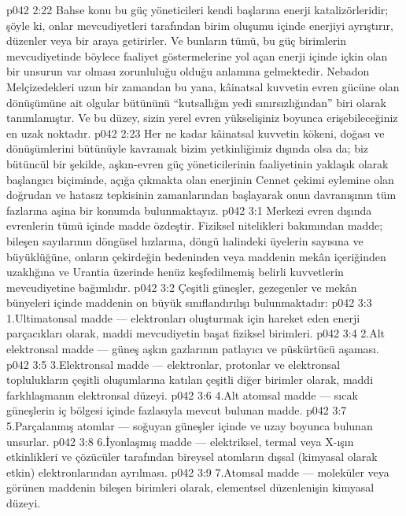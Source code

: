 \vs p042 2:22 Bahse konu bu güç yöneticileri kendi başlarına enerji katalizörleridir; şöyle ki, onlar mevcudiyetleri tarafından birim oluşumu içinde enerjiyi ayrıştırır, düzenler veya bir araya getirirler. Ve bunların tümü, bu güç birimlerin mevcudiyetinde böylece faaliyet göstermelerine yol açan enerji içinde içkin olan bir unsurun var olması zorunluluğu olduğu anlamına gelmektedir. Nebadon Melçizedekleri uzun bir zamandan bu yana, kâinatsal kuvvetin evren gücüne olan dönüşümüne ait olgular bütününü “kutsallığın yedi sınırsızlığından” biri olarak tanımlamıştır. Ve bu düzey, sizin yerel evren yükselişiniz boyunca erişebileceğiniz en uzak noktadır.
\vs p042 2:23 Her ne kadar kâinatsal kuvvetin kökeni, doğası ve dönüşümlerini bütünüyle kavramak bizim yetkinliğimiz dışında olsa da; biz bütüncül bir şekilde, aşkın\hyp{}evren güç yöneticilerinin faaliyetinin yaklaşık olarak başlangıcı biçiminde, açığa çıkmakta olan enerjinin Cennet çekimi eylemine olan doğrudan ve hatasız tepkisinin zamanlarından başlayarak onun davranışının tüm fazlarına aşina bir konumda bulunmaktayız.
\vs p042 3:1 Merkezi evren dışında evrenlerin tümü içinde madde özdeştir. Fiziksel nitelikleri bakımından madde; bileşen sayılarının döngüsel hızlarına, döngü halindeki üyelerin sayısına ve büyüklüğüne, onların çekirdeğin bedeninden veya maddenin mekân içeriğinden uzaklığına ve Urantia üzerinde henüz keşfedilmemiş belirli kuvvetlerin mevcudiyetine bağımlıdır.
\vs p042 3:2 Çeşitli güneşler, gezegenler ve mekân bünyeleri içinde maddenin on büyük sınıflandırılışı bulunmaktadır:
\vs p042 3:3 1.\bibnobreakspace Ultimatonsal madde --- elektronları oluşturmak için hareket eden enerji parçacıkları olarak, maddi mevcudiyetin başat fiziksel birimleri.
\vs p042 3:4 2.\bibnobreakspace Alt elektronsal madde --- güneş aşkın gazlarının patlayıcı ve püskürtücü aşaması.
\vs p042 3:5 3.\bibnobreakspace Elektronsal madde --- elektronlar, protonlar ve elektronsal toplulukların çeşitli oluşumlarına katılan çeşitli diğer birimler olarak, maddi farklılaşmanın elektronsal düzeyi.
\vs p042 3:6 4.\bibnobreakspace Alt atomsal madde --- sıcak güneşlerin iç bölgesi içinde fazlasıyla mevcut bulunan madde.
\vs p042 3:7 5.\bibnobreakspace Parçalanmış atomlar --- soğuyan güneşler içinde ve uzay boyunca bulunan unsurlar.
\vs p042 3:8 6.\bibnobreakspace İyonlaşmış madde --- elektriksel, termal veya X\hyp{}ışın etkinlikleri ve çözücüler tarafından bireysel atomların dışsal (kimyasal olarak etkin) elektronlarından ayrılması.
\vs p042 3:9 7.\bibnobreakspace Atomsal madde --- moleküler veya görünen maddenin bileşen birimleri olarak, elementsel düzenlenişin kimyasal düzeyi.
